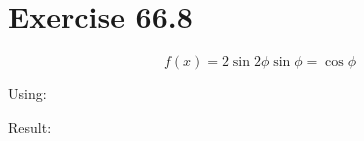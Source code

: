 \documentclass[a4paper, 10pt]{scrartcl}
\begin{document}
\section{Exercise 66.8}

\[f(x) = 2\sin{2\phi}\sin{\phi} = \cos{\phi}\]

Using:

Result:
\end{document}
